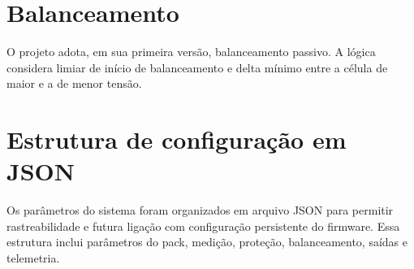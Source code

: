 \section{Balanceamento}

O projeto adota, em sua primeira versão, balanceamento passivo. A lógica considera limiar de
início de balanceamento e delta mínimo entre a célula de maior e a de menor tensão.

\section{Estrutura de configuração em JSON}

Os parâmetros do sistema foram organizados em arquivo JSON para permitir rastreabilidade e futura
ligação com configuração persistente do firmware. Essa estrutura inclui parâmetros do pack,
medição, proteção, balanceamento, saídas e telemetria.
